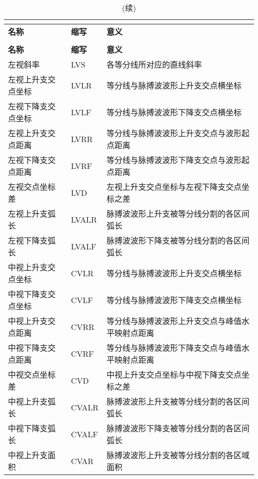 \begin{center}
  \begin{longtable}{m{4cm}<{\centering}m{2cm}<{\centering}m{8.5cm}<{\centering}}
    \caption{本研究使用的所有PPG时域指标一览}\\
    \label{tab:allfeatures}\\
        \toprule
        \textbf{名称}&\textbf{缩写}&\textbf{意义}\\
        \midrule
        \endfirsthead
        \caption[]{(续)}\\
        \midrule
        \textbf{名称}&\textbf{缩写}&\textbf{意义}\\
        \midrule
        \endhead 
        \midrule
        \endfoot
        \bottomrule
        \endlastfoot
        左视斜率    &   LVS    &   各等分线所对应的直线斜率   \\
        左视上升支交点坐标 & LVLR & 等分线与脉搏波波形上升支交点横坐标 \\
        左视下降支交点坐标 & LVLF & 等分线与脉搏波波形下降支交点横坐标 \\
        左视上升支交点距离 & LVRR & 等分线与脉搏波波形上升支交点与波形起点距离 \\
        左视下降支交点距离 & LVRF & 等分线与脉搏波波形下降支交点与波形起点距离 \\
        左视交点坐标差 & LVD & 左视上升支交点坐标与左视下降支交点坐标之差 \\
        左视上升支弧长 & LVALR & 脉搏波波形上升支被等分线分割的各区间弧长 \\
        左视下降支弧长 & LVALF & 脉搏波波形下降支被等分线分割的各区间弧长 \\
        中视上升支交点坐标 & CVLR & 等分线与脉搏波波形上升支交点横坐标 \\
        中视下降支交点坐标 & CVLF & 等分线与脉搏波波形下降支交点横坐标 \\
        中视上升支交点距离 & CVRR & 等分线与脉搏波波形上升支交点与峰值水平映射点距离 \\
        中视下降支交点距离 & CVRF & 等分线与脉搏波波形下降支交点与峰值水平映射点距离 \\
        中视交点坐标差 & CVD & 中视上升支交点坐标与中视下降支交点坐标之差 \\
        中视上升支弧长 & CVALR & 脉搏波波形上升支被等分线分割的各区间弧长 \\
        中视下降支弧长 & CVALF & 脉搏波波形下降支被等分线分割的各区间弧长 \\
        中视上升支面积 & CVAR & 脉搏波波形上升支被等分线分割的各区域面积 \\

\end{longtable}
\end{center}
